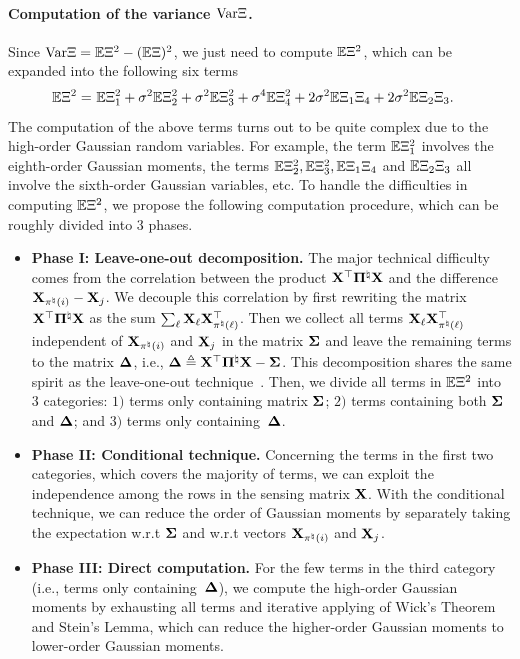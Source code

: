 \documentclass[11pt]{article}
\begin{document}
\paragraph{Computation of the variance $\textup{Var}\Xi$.}
Since
$\textup{Var} \Xi = \mathbb{E} \Xi^2 - (\mathbb{E} \Xi)^2$, we just need to
compute $\mathbb{E} \Xi^2$, which can be expanded into the following six terms
\begin{align}
\label{eq:non_oracle_var}
\Expc \Xi^2 =~&\Expc \Xi_1^2 + \sigma^2 \Expc \Xi_2^2 + \sigma^2\Expc \Xi_3^2
+ \sigma^4\Expc \Xi_4^2 + 2\sigma^2 \Expc \Xi_1 \Xi_4 + 2\sigma^2\Expc \Xi_2 \Xi_3.
\vspace{-2mm}
\end{align}
The computation of the above terms turns out to be quite complex due to the
high-order Gaussian random variables. For example, the term $\mathbb{E} \Xi_1^2$
involves the eighth-order Gaussian moments,
the terms $\mathbb{E} \Xi_2^2, \mathbb{E} \Xi_3^2, \mathbb{E} \Xi_1 \Xi_4$ and
$\mathbb{E} \Xi_2\Xi_3$ all involve the sixth-order Gaussian variables, etc.
To handle the difficulties in computing $\mathbb{E} \Xi^2$,
we propose the following computation procedure, which
can be roughly divided into $3$ phases.
\begin{itemize}[leftmargin=*]
\item
\textbf{Phase I: Leave-one-out decomposition.}
The major technical difficulty comes from the
correlation between the product $\mathbf{X}^{\top}\boldsymbol{\Pi}^{\natural}\mathbf{X}$ and
the difference $\mathbf{X}_{\pi^{\natural}(i)} - \mathbf{X}_j$.
We decouple this correlation by first
rewriting the matrix
$\mathbf{X}^{\top}\boldsymbol{\Pi}^{\natural}\mathbf{X}$ as the sum
$\sum_{\ell} \mathbf{X}_{\ell}\mathbf{X}_{\pi^{\natural}(\ell)}^{\top}$.
Then we collect all terms $\mathbf{X}_{\ell} \mathbf{X}_{\pi^{\natural}(\ell)}^{\top}$
independent of $\mathbf{X}_{\pi^{\natural}(i)}$ and $\mathbf{X}_j$ in
the matrix $\boldsymbol{\Sigma}$ and leave the remaining terms to the
 matrix
$\boldsymbol{\Delta}$, i.e., $\boldsymbol{\Delta}
\triangleq \mathbf{X}^{\top}\boldsymbol{\Pi}^{\natural}\mathbf{X} - \boldsymbol{\Sigma}$.
This decomposition shares the same
spirit as the leave-one-out technique~\citep{karoui2013asymptotic, bai2010spectral, karoui2018impact, sur2019likelihood}. Then, we divide all terms  in
$\mathbb{E} \Xi^2$ into  $3$ categories:
$1)$ terms only containing
matrix $\boldsymbol{\Sigma}$; $2)$ terms containing both
$\boldsymbol{\Sigma}$ and $\boldsymbol{\Delta}$; and $3)$ terms only containing~$\boldsymbol{\Delta}$.



\item
\textbf{Phase II: Conditional technique.}
Concerning the terms in the first two categories, which covers the
majority of terms,
we can exploit the independence among the rows in the sensing matrix
$\mathbf{X}$. With the conditional technique, we can
reduce the order of  Gaussian moments by
separately taking the expectation w.r.t $\boldsymbol{\Sigma}$ and
w.r.t vectors $\mathbf{X}_{\pi^{\natural}(i)}$ and $\mathbf{X}_j$.

\item
\textbf{Phase III: Direct computation.}
For the few terms in the third category (i.e., terms only containing~$\boldsymbol{\Delta}$),
we compute the high-order Gaussian moments by exhausting
all terms and iterative applying
of Wick's Theorem and Stein's Lemma, which
can reduce the higher-order Gaussian moments to lower-order Gaussian moments.
\end{itemize}
\end{document}
